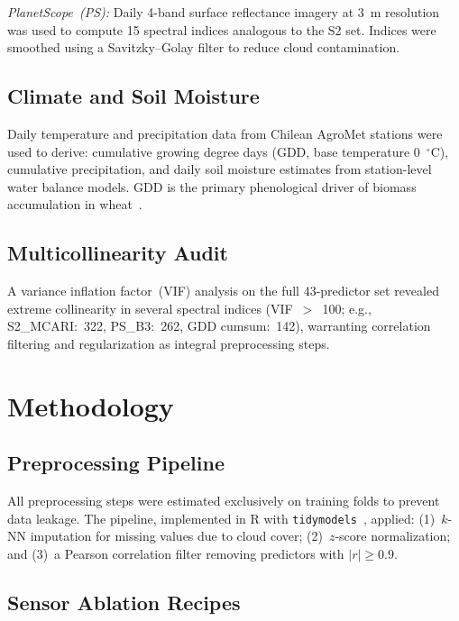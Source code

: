 \documentclass[lettersize,journal]{IEEEtran}
\begin{document}
\textit{PlanetScope~(PS):} Daily 4-band surface reflectance imagery at 3~m
resolution was used to compute 15 spectral indices analogous to the S2 set.
Indices were smoothed using a Savitzky--Golay filter to reduce cloud
contamination.

\subsection{Climate and Soil Moisture}

Daily temperature and precipitation data from Chilean AgroMet stations were
used to derive: cumulative growing degree days (GDD, base temperature 0~$^{\circ}$C),
cumulative precipitation, and daily soil moisture estimates from station-level
water balance models. GDD is the primary phenological driver of biomass
accumulation in wheat~\cite{ref14}.

\subsection{Multicollinearity Audit}

A variance inflation factor~(VIF) analysis on the full 43-predictor set
revealed extreme collinearity in several spectral indices (VIF~$>$~100;
e.g., S2\_MCARI:~322, PS\_B3:~262, GDD cumsum:~142), warranting
correlation filtering and regularization as integral preprocessing steps.

\section{Methodology}

\subsection{Preprocessing Pipeline}

All preprocessing steps were estimated exclusively on training folds to
prevent data leakage. The pipeline, implemented in R with
\texttt{tidymodels}~\cite{ref15}, applied: (1)~$k$-NN imputation for missing
values due to cloud cover; (2)~$z$-score normalization; and (3)~a Pearson
correlation filter removing predictors with $|r| \geq 0.9$.

\subsection{Sensor Ablation Recipes}
\end{document}
